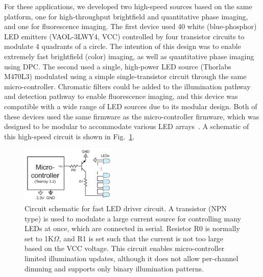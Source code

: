 For these applications, we developed two high-speed sources based on the same platform, one for high-throughput brightfield and quantitative phase imaging, and one for fluorescence imaging. The first device used 40 white (blue-phosphor) LED emitters (VAOL-3LWY4, VCC) controlled by four transistor circuits to modulate 4 quadrants of a circle. The intention of this design was to enable extremely fast brightfield (color) imaging, as well as quantitative phase imaging using DPC. The second used a single, high-power LED source (Thorlabs M470L3) modulated using a simple single-transistor circuit through the same micro-controller. Chromatic filters could be added to the illumination pathway and detection pathway to enable fluorescence imaging, and this device was compatible with a wide range of LED sources due to its modular design. Both of these devices used the same firmware as the micro-controller firmware, which was designed to be modular to accommodate various LED arrays~\cite{illuminate}. A schematic of this high-speed circuit is shown in Fig.~\ref{fig:fabrication_highthroughput_circuit}.

\begin{figure}
    \centering
    \includegraphics[width=0.4\textwidth]{figures/fig_fabrication_fast_circuit.pdf}
    \caption{Circuit schematic for fast LED driver circuit. A transistor (NPN type) is used to modulate a large current source for controlling many LEDs at once, which are connected in serial. Resistor R0 is normally set to 1K$\Omega$, and R1 is set such that the current is not too large based on the VCC voltage. This circuit enables micro-controller limited illumination updates, although it does not allow per-channel dimming and supports only binary illumination patterns.}\label{fig:fabrication_highthroughput_circuit}
\end{figure}

\clearpage

